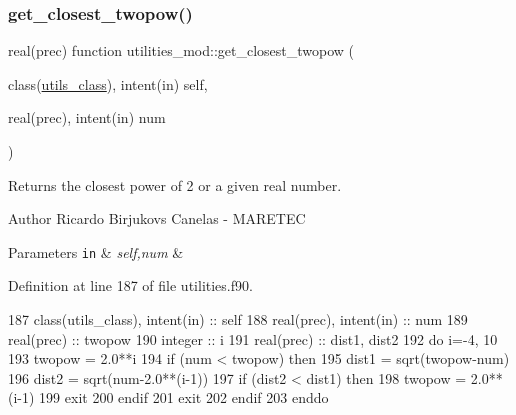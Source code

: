 \subsubsection{\texorpdfstring{get\+\_\+closest\+\_\+twopow()}{get\_closest\_twopow()}}
{\footnotesize\ttfamily real(prec) function utilities\+\_\+mod\+::get\+\_\+closest\+\_\+twopow (\begin{DoxyParamCaption}\item[{class(\mbox{\hyperlink{structutilities__mod_1_1utils__class}{utils\+\_\+class}}), intent(in)}]{self,  }\item[{real(prec), intent(in)}]{num }\end{DoxyParamCaption})\hspace{0.3cm}{\ttfamily [private]}}



Returns the closest power of 2 or a given real number. 

\begin{DoxyAuthor}{Author}
Ricardo Birjukovs Canelas -\/ M\+A\+R\+E\+T\+EC 
\end{DoxyAuthor}

\begin{DoxyParams}[1]{Parameters}
\mbox{\tt in}  & {\em self,num} & \\
\hline
\end{DoxyParams}


Definition at line 187 of file utilities.\+f90.


\begin{DoxyCode}
187     \textcolor{keywordtype}{class}(utils\_class), \textcolor{keywordtype}{intent(in)} :: self
188     \textcolor{keywordtype}{real(prec)}, \textcolor{keywordtype}{intent(in)} :: num
189     \textcolor{keywordtype}{real(prec)} :: twopow
190     \textcolor{keywordtype}{integer} :: i
191     \textcolor{keywordtype}{real(prec)} :: dist1, dist2
192     \textcolor{keywordflow}{do} i=-4, 10
193         twopow = 2.0**i
194         \textcolor{keywordflow}{if} (num < twopow) \textcolor{keywordflow}{then}
195             dist1 = sqrt(twopow-num)
196             dist2 = sqrt(num-2.0**(i-1))
197             \textcolor{keywordflow}{if} (dist2 < dist1) \textcolor{keywordflow}{then}
198                 twopow = 2.0**(i-1)
199                 \textcolor{keywordflow}{exit}
200 \textcolor{keywordflow}{            endif}
201             \textcolor{keywordflow}{exit}
202 \textcolor{keywordflow}{        endif}
203 \textcolor{keywordflow}{    enddo}
\end{DoxyCode}
\mbox{\label{namespaceutilities__mod_ab5b97f243f9347a40db76d55509d37ca}} 
